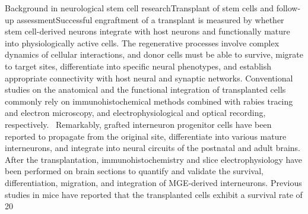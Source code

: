 Background in neurological stem cell  researchTransplant of stem cells and follow-up assessmentSuccessful  engraftment of a transplant is measured by whether stem cell-derived neurons  integrate with host neurons and functionally mature into physiologically active  cells. The regenerative processes involve complex dynamics of cellular  interactions, and donor cells must be able to survive, migrate to target sites,  differentiate into specific neural phenotypes, and establish appropriate  connectivity with host neural and synaptic networks. Conventional studies on  the anatomical and the functional integration of transplanted cells commonly  rely on immunohistochemical methods combined with rabies tracing and electron  microscopy, and electrophysiological and optical recording, respectively.  Remarkably,  grafted interneuron progenitor cells have been reported to propagate from the  original site, differentiate into various mature interneurons, and integrate  into neural circuits of the postnatal and adult brains. After the  transplantation, immunohistochemistry and slice electrophysiology have been  performed on brain sections to quantify and validate the survival,  differentiation, migration, and integration of MGE-derived interneurons.  Previous studies in mice have reported that the transplanted cells exhibit a  survival rate of 20 %